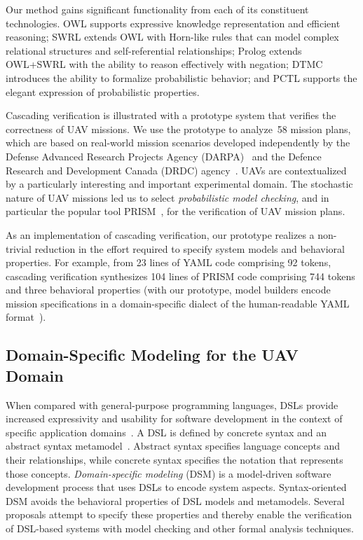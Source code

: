 Our method gains significant functionality from each of its constituent technologies. OWL supports expressive knowledge representation and efficient reasoning; SWRL extends OWL with Horn-like rules that can model complex relational structures and self-referential relationships; Prolog extends OWL+SWRL with the ability to reason effectively with negation; DTMC introduces the ability to formalize probabilistic behavior; and PCTL supports the elegant expression of probabilistic properties.

Cascading verification is illustrated with a prototype system that verifies the correctness of UAV missions. We use the prototype to analyze~58 mission plans, which are based on real-world mission scenarios developed independently by the Defense Advanced Research Projects Agency (DARPA)~\cite{DARPA} and the Defence Research and Development Canada (DRDC) agency~\cite{Youngson_2004}. UAVs are contextualized by a particularly interesting and important experimental domain. The stochastic nature of UAV missions led us to select \emph{probabilistic model checking}, and in particular the popular tool PRISM~\cite{Hinton_2006}, for the verification of UAV mission plans.

As an implementation of cascading verification, our prototype realizes a non-trivial reduction in the effort required to specify system models and behavioral properties. For example, from 23 lines of YAML code comprising 92 tokens, cascading verification synthesizes 104 lines of PRISM code comprising 744 tokens and three behavioral properties (with our prototype, model builders encode mission specifications in a domain-specific dialect of the human-readable YAML format~\cite{Evans}).

\subsection{Domain-Specific Modeling for the UAV Domain}

When compared with general-purpose programming languages, DSLs provide increased expressivity and usability for software development in the context of specific application domains~\cite{Mernik_2005}. A DSL is defined by concrete syntax and an abstract syntax metamodel~\cite{Rivera_2009}. Abstract syntax specifies language concepts and their relationships, while concrete syntax specifies the notation that represents those concepts. \emph{Domain-specific modeling} (DSM) is a model-driven software development process that uses DSLs to encode system aspects. Syntax-oriented DSM avoids the behavioral properties of DSL models and metamodels. Several proposals attempt to specify these properties and thereby enable the verification of DSL-based systems with model checking and other formal analysis techniques.


